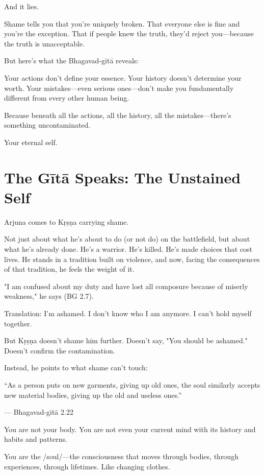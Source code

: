 \documentclass[11pt,twoside]{book}
\begin{document}
And it lies.

Shame tells you that you're uniquely broken. That everyone else is fine and you're the exception. That if people knew the truth, they'd reject you—because the truth is unacceptable.

But here's what the Bhagavad-gītā reveals:

Your actions don't define your essence. Your history doesn't determine your worth. Your mistakes—even serious ones—don't make you fundamentally different from every other human being.

Because beneath all the actions, all the history, all the mistakes—there's something uncontaminated.

Your eternal self.

\section*{The Gītā Speaks: The Unstained Self}

Arjuna comes to Kṛṣṇa carrying shame.

Not just about what he's about to do (or not do) on the battlefield, but about what he's already done. He's a warrior. He's killed. He's made choices that cost lives. He stands in a tradition built on violence, and now, facing the consequences of that tradition, he feels the weight of it.

"I am confused about my duty and have lost all composure because of miserly weakness," he says (BG 2.7).

Translation: I'm ashamed. I don't know who I am anymore. I can't hold myself together.

But Kṛṣṇa doesn't shame him further. Doesn't say, "You should be ashamed." Doesn't confirm the contamination.

Instead, he points to what shame can't touch:

\begin{pullquote}
``As a person puts on new garments, giving up old ones, the soul similarly accepts new material bodies, giving up the old and useless ones.''

--- Bhagavad-gītā 2.22
\end{pullquote}

You are not your body. You are not even your current mind with its history and habits and patterns.

You are the /soul/—the consciousness that moves through bodies, through experiences, through lifetimes. Like changing clothes.
\end{document}
